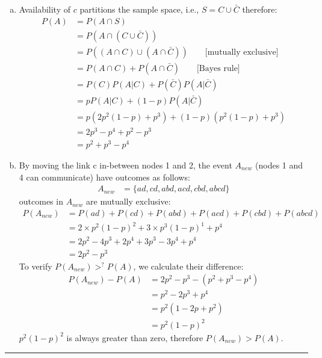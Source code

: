 \documentclass[12pt, letterpaper]{scrartcl}
\begin{document}
\begin{enumerate}[a.]
    \item Availability of $c$ partitions the sample space, i.e., $S=C\cup\bar{C}$ therefore:
    \begin{align*}
        P(A)&=P(A\cap S)\\
        &=P(A\cap(C\cup\bar{C}))\\
        &=P((A\cap C)\cup (A\cap\bar{C}))  \qquad \text{[mutually exclusive]}\\
        &=P(A\cap C) + P(A\cap\bar{C}) \qquad \text{[Bayes rule]}\\
        &=P(C)P(A|C)+P(\bar{C})P(A|\bar{C})\\
        &=pP(A|C)+(1-p)P(A|\bar{C})\\
        &=p(2p^2(1-p)+p^3) + (1-p)(p^2(1-p)+p^3)\\
        &=2p^3-p^4+p^2-p^3\\
        &=p^2+p^3-p^4
    \end{align*}
    \item By moving the link c in-between nodes 1 and 2, the event $A_{new}$ (nodes 1 and 4 can communicate) have outcomes as follows:
    \begin{align*}
        A_{new} &= \{ad, cd, abd, acd, cbd, abcd\}
    \end{align*}
    outcomes in $A_{new}$ are mutually exclusive:
    \begin{align*}
        P(A_{new}) &= P(ad)+P(cd)+P(abd)+P(acd)+P(cbd)+P(abcd)\\
        &= 2\times p^2(1-p)^2+3\times p^3(1-p)^1+p^4\\
        &= 2p^2-4p^3+2p^4+3p^3-3p^4+p^4\\
        &= 2p^2-p^3
    \end{align*}
    To verify $P(A_{new})>^?P(A)$, we calculate their difference:
    \begin{align*}
        P(A_{new})-P(A)&=2p^2-p^3 - (p^2+p^3-p^4)\\
        &=p^2-2p^3+p^4\\
        &=p^2(1-2p+p^2)\\
        &=p^2(1-p)^2
    \end{align*}
    $p^2(1-p)^2$ is always greater than zero, therefore $P(A_{new})>P(A)$.
\end{enumerate}
\hrule
\end{document}
